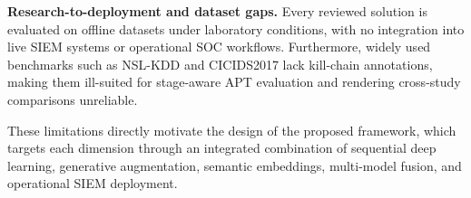 \textbf{Research-to-deployment and dataset gaps.} Every reviewed solution is evaluated on offline datasets under laboratory conditions, with no integration into live SIEM systems or operational SOC workflows. Furthermore, widely used benchmarks such as NSL-KDD and CICIDS2017 lack kill-chain annotations, making them ill-suited for stage-aware APT evaluation and rendering cross-study comparisons unreliable.

These limitations directly motivate the design of the proposed framework, which targets each dimension through an integrated combination of sequential deep learning, generative augmentation, semantic embeddings, multi-model fusion, and operational SIEM deployment.